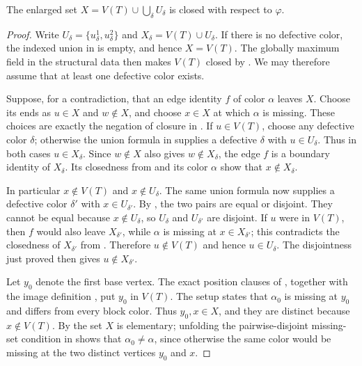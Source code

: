 \begin{lemma}
The enlarged set $X=V(T)\cup\bigcup_\delta U_\delta$ is closed with
respect to $\varphi$.
\end{lemma}
\begin{proof}
Write $U_\delta=\{u^1_\delta,u^2_\delta\}$ and
$X_\delta=V(T)\cup U_\delta$.  If there is no defective color, the
indexed union in  is empty, and hence
$X=V(T)$.  The globally maximum field in the structural data then makes
$V(T)$ closed by .  We may therefore
assume that at least one defective color exists.

Suppose, for a contradiction, that an edge identity $f$ of color
$\alpha$ leaves $X$.  Choose its ends as $u\in X$ and $w\notin X$, and
choose $x\in X$ at which $\alpha$ is missing.  These choices are exactly
the negation of closure in .  If
$u\in V(T)$, choose any defective color $\delta$; otherwise the union
formula in  supplies a defective
$\delta$ with $u\in U_\delta$.  Thus in both cases $u\in X_\delta$.
Since $w\notin X$ also gives $w\notin X_\delta$, the edge $f$ is a
boundary identity of $X_\delta$.  Its closedness from
 and its color $\alpha$ show that
$x\notin X_\delta$.

In particular $x\notin V(T)$ and $x\notin U_\delta$.  The same union
formula now supplies a defective color $\delta'$ with
$x\in U_{\delta'}$.  By
, the two pairs are equal or
disjoint.  They cannot be equal because $x\notin U_\delta$, so
$U_\delta$ and $U_{\delta'}$ are disjoint.  If $u$ were in $V(T)$, then
$f$ would also leave $X_{\delta'}$, while $\alpha$ is missing at
$x\in X_{\delta'}$; this contradicts the closedness of
$X_{\delta'}$ from .  Therefore
$u\notin V(T)$ and hence $u\in U_\delta$.  The disjointness just proved
then gives $u\notin X_{\delta'}$.

Let $y_0$ denote the first base vertex.  The exact position clauses of
, together with the image
definition , put $y_0$ in $V(T)$.  The
setup  states that $\alpha_0$ is missing
at $y_0$ and differs from every block color.  Thus $y_0,x\in X$, and
they are distinct because $x\notin V(T)$.  By
 the set $X$ is elementary; unfolding
the pairwise-disjoint missing-set condition in
 shows that
$\alpha_0\ne\alpha$, since otherwise the same color would be missing at
the two distinct vertices $y_0$ and $x$.


\end{proof}
